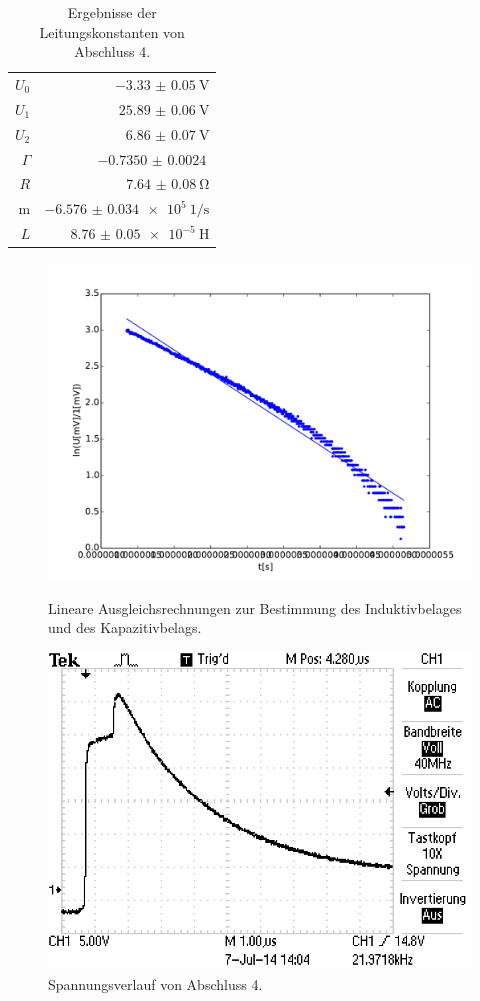 \begin{table}
\centering
	\caption[]{Ergebnisse der Leitungskonstanten von Abschluss 4.}
	\begin{tabular}{r|r}
		\hline\hline
		$U_0$    & $\SI{-3.33(5)}{\volt}$\\
		$U_1$    & $\SI{25.89(6)}{\volt}$\\
		$U_2$    & $\SI{6.86(7)}{\volt}$\\
		$\Gamma$ & $\SI{-0.7350(24)}{}$\\
		$R$    & $\SI{7.64(8)}{\ohm}$\\
		m      & $\SI{-6.576(34)e5}{1\per\second}$\\
		$L$    & $\SI{8.76(5)e-5}{\henry}$\\
	\end{tabular}
\end{table}

\begin{figure}
	\centering
	\includegraphics[width = 14cm]{data/d/Regression2.pdf}
	\caption{Lineare Ausgleichsrechnungen zur Bestimmung des Induktivbelages und des Kapazitivbelags.}
	\includegraphics[width = 12cm]{data/d/F0005TEK.JPG}
	\caption{Spannungsverlauf von Abschluss 4.}
	\label{fig_abs4}
\end{figure}
